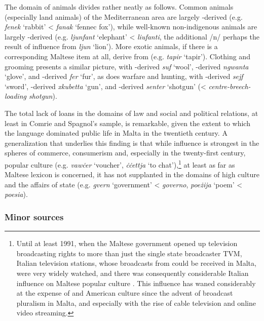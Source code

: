 \documentclass[output=paper]{langsci/langscibook}
\begin{document}
The domain of animals divides rather neatly as follows. Common animals (especially land animals) of the Mediterranean area are largely -derived (e.g. \textit{fenek} `rabbit' <   \textit{fanak} `fennec fox'), while well-known non-indigenous animals are largely -derived (e.g. \textit{ljunfant} `elephant' <  \textit{liufanti}, the additional /n/ perhaps the result of influence from \textit{ljun} `lion'). More exotic animals, if there is a corresponding Maltese item at all, derive from  (e.g. \textit{tapir} `tapir'). Clothing and grooming presents a similar picture, with -derived \textit{suf} `wool', -derived \textit{ngwanta} `glove', and -derived \textit{fer} `fur', as does warfare and hunting, with -derived \textit{sejf} `sword', -derived \textit{xkubetta} `gun', and -derived \textit{senter} `shotgun' (< \textit{centre-breech-loading shotgun}).

The total lack of  loans in the domains of law and social and political relations, at least in Comrie and Spagnol's sample, is remarkable, given the extent to which the  language dominated public life in Malta in the twentieth century. A generalization that underlies this finding is that while  influence is strongest in the spheres of commerce, consumerism and, especially in the twenty-first century, popular culture (e.g. \textit{vawċer} `voucher', \textit{ċċettja} `to chat'),\footnote{Until at least 1991, when the Maltese government opened up television broadcasting rights to more than just the single state broadcaster TVM, Italian television stations, whose broadcasts from  could be received in Malta, were very widely watched, and there was consequently considerable Italian influence on Maltese popular culture \citep{sammut2007}. This influence has waned considerably at the expense of  and American culture since the advent of broadcast pluralism in Malta, and especially with the rise of cable television and online video streaming.} at least as far as Maltese lexicon is concerned, it has not supplanted  in the domains of high culture and the affairs of state (e.g. \textit{gvern} `government' <  \textit{governo}, \textit{poeżija} `poem' <  \textit{poesia}).

\subsubsection{Minor sources}
\end{document}
